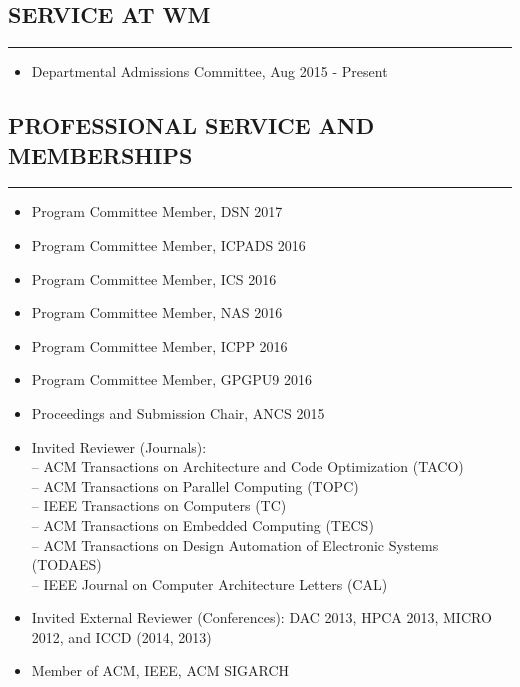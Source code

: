 \documentclass[10pt,a4]{article}
\begin{document}
\subsection*{SERVICE AT WM}
\hrule
\vspace{0.2cm}
\begin{itemize}
	\item Departmental Admissions Committee, Aug 2015 - Present
\end{itemize}

\subsection*{PROFESSIONAL SERVICE AND MEMBERSHIPS}
\hrule
\vspace{0.2cm}
\begin{itemize}
	\item Program Committee Member, DSN 2017
	\item Program Committee Member, ICPADS 2016 
	\item Program Committee Member, ICS 2016
	\item Program Committee Member, NAS 2016
	\item Program Committee Member, ICPP 2016
	\item Program Committee Member, GPGPU9 2016
	\item Proceedings and Submission Chair, ANCS 2015
	\item Invited Reviewer (Journals):  \\
	-- ACM Transactions on Architecture and Code Optimization (TACO) \\
	-- ACM Transactions on Parallel Computing (TOPC) \\
	-- IEEE Transactions on Computers (TC) \\ 
	-- ACM Transactions on Embedded Computing (TECS) \\
	-- ACM Transactions on Design Automation of Electronic Systems (TODAES) \\
	-- IEEE Journal on Computer Architecture Letters (CAL)
	\item Invited External Reviewer (Conferences):
	DAC 2013, HPCA 2013, MICRO 2012, and ICCD (2014, 2013)
	\item Member of ACM, IEEE, ACM SIGARCH
\end{itemize}
\end{document}
